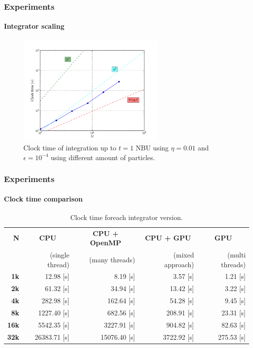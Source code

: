 \begin{frame}
    \frametitle{Experiments}
    \framesubtitle{Integrator scaling}

\begin{figure}[H]
    \centering
    \label{fig:time}
    \includegraphics[width=0.65\textwidth]{img/test_time-1t-N.pdf}
    \caption{Clock time of integration up to $t=1$ NBU using $\eta = 0.01$ and
             $\epsilon = 10^{-4}$ using different amount of particles.}
\end{figure}

\end{frame}
\begin{frame}
    \frametitle{Experiments}
    \framesubtitle{Clock time comparison}

\begin{table}[H]
    \centering
    \footnotesize
    \begin{tabular}{rrrrr}
        \hline
        {\bf N} & \multicolumn{1}{c}{\bf CPU}
                & \multicolumn{1}{c}{\bf CPU + OpenMP}
                & \multicolumn{1}{c}{\bf CPU + GPU}
                & \multicolumn{1}{c}{\bf GPU}   \\
                & (single thread) & (many threads)     & (mixed approach) &  (multi threads) \\ \hline
         {\bf  1k} &    12.98 [s] &   8.19 [s] &    3.57 [s]           &    1.21 [s]          \\
         {\bf  2k} &    61.32 [s] &  34.94 [s] &   13.42 [s]           &    3.22 [s]          \\
         {\bf  4k} &   282.98 [s] & 162.64 [s] &   54.28 [s]           &    9.45 [s]          \\
         {\bf  8k} &  1227.40 [s] & 682.56 [s] &  208.91 [s]           &   23.31 [s]          \\
         {\bf 16k} &  5542.35 [s] & 3227.91 [s] &  904.82 [s]           &   82.63 [s]          \\
         {\bf 32k} & 26383.71 [s] & 15076.40 [s] & 3722.92 [s]           &  275.53 [s]          \\ \hline
    \end{tabular}
    \caption{Clock time foreach integrator version.}
    \label{tab:acc}
\end{table}

\end{frame}

